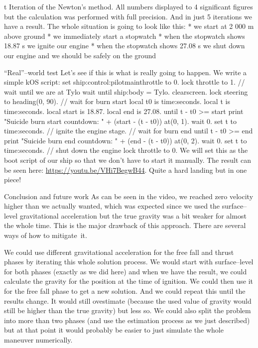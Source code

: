     \caption/t {
        Iteration of the Newton's method.
        All numbers displayed to 4 significant figures but the calculation was performed with full precision.
    }
\endinsert
And in just 5 iterations we have a result.
The whole situation is going to look like this:
\begitems
    * we start at 2 000 m above ground
    * we immediately start a stopwatch
    * when the stopwatch shows 18.87 s we ignite our engine
    * when the stopwatch shows 27.08 s we shut down our engine and we should be safely on the ground
\enditems

\sec ``Real''--world test
Let's see if this is what is really going to happen.
We write a simple kOS script:
\begtt
set ship:control:pilotmainthrottle to 0.
lock throttle to 1.
// wait until we are at Tylo
wait until ship:body = Tylo.
clearscreen.
lock steering to heading(0, 90).
// wait for burn start
local t0 is time:seconds.
local t is time:seconds.
local start is 18.87.
local end is 27.08.
until t - t0 >= start {
  print "Suicide burn start countdown: " + (start - (t - t0)) at(0, 1).
  wait 0.
  set t to time:seconds.
}
// ignite the engine
stage.
// wait for burn end
until t - t0 >= end {
  print "Suicide burn end countdown: " + (end - (t - t0)) at(0, 2).
  wait 0.
  set t to time:seconds.
}
// shut down the engine
lock throttle to 0.
\endtt
We will set this as the boot script of our ship so that we don't have to start it manually.
The result can be seen here: \url{https://youtu.be/VHi7BegwB44}.
Quite a hard landing but in one piece!

\chap Conclusion and future work
As can be seen in the video, we reached zero velocity higher than we actually wanted, which was expected since we used the surface--level gravitational acceleration but the true gravity was a bit weaker for almost the whole time.
This is the major drawback of this approach.
There are several ways of how to mitigate~it.

We could use different gravitational acceleration for the free fall and thrust phases by iterating this whole solution process.
We would start with surface--level for both phases (exactly as we did here) and when we have the result, we could calculate the gravity for the position at the time of ignition.
We could then use it for the free fall phase to get a new solution.
And we could repeat this until the results change.
It would still ovestimate (because the used value of gravity would still be higher than the true gravity) but less so.
We could also split the problem into more than two phases (and use the estimation process as we just described) but at that point it would probably be easier to just simulate the whole maneuver numerically.

